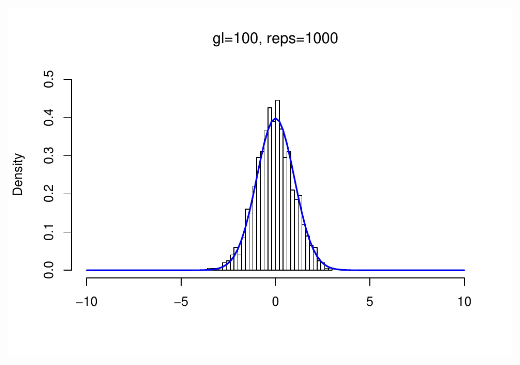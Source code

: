 \documentclass[]{article}
\begin{document}
\includegraphics{NotaDeClaseLong_files/figure-latex/unnamed-chunk-15-2.pdf}
\end{document}

